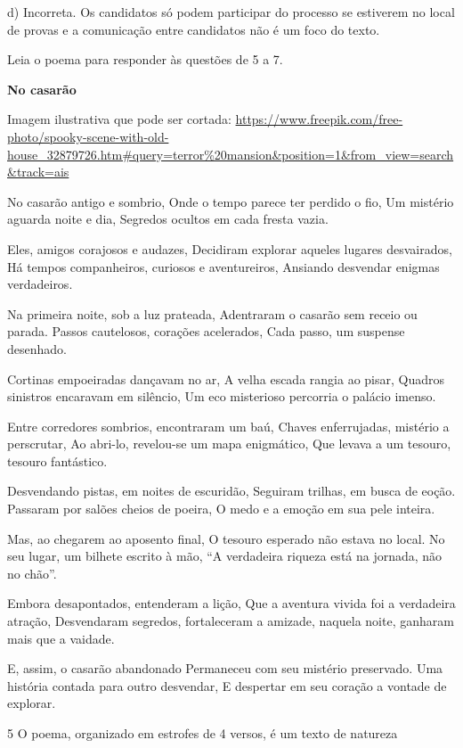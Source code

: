 \begin{escolha}
\begin{escolha}
\begin{escolha}
\begin{escolha}
\begin{escolha}
d) Incorreta. Os candidatos só podem participar do processo se estiverem
no local de provas e a comunicação entre candidatos não é um foco do
texto.

Leia o poema para responder às questões de 5 a 7.

\textbf{No casarão}

Imagem ilustrativa que pode ser cortada:
\url{https://www.freepik.com/free-photo/spooky-scene-with-old-house_32879726.htm\#query=terror\%20mansion\&position=1\&from_view=search\&track=ais}

No casarão antigo e sombrio, Onde o tempo parece ter perdido o fio, Um
mistério aguarda noite e dia, Segredos ocultos em cada fresta vazia.

Eles, amigos corajosos e audazes, Decidiram explorar aqueles lugares
desvairados, Há tempos companheiros, curiosos e aventureiros, Ansiando
desvendar enigmas verdadeiros.

Na primeira noite, sob a luz prateada, Adentraram o casarão sem receio
ou parada. Passos cautelosos, corações acelerados, Cada passo, um
suspense desenhado.

Cortinas empoeiradas dançavam no ar, A velha escada rangia ao pisar,
Quadros sinistros encaravam em silêncio, Um eco misterioso percorria o
palácio imenso.

Entre corredores sombrios, encontraram um baú, Chaves enferrujadas,
mistério a perscrutar, Ao abri-lo, revelou-se um mapa enigmático, Que
levava a um tesouro, tesouro fantástico.

Desvendando pistas, em noites de escuridão, Seguiram trilhas, em busca
de eoção. Passaram por salões cheios de poeira, O medo e a emoção em sua
pele inteira.

Mas, ao chegarem ao aposento final, O tesouro esperado não estava no
local. No seu lugar, um bilhete escrito à mão, ``A verdadeira riqueza
está na jornada, não no chão''.

Embora desapontados, entenderam a lição, Que a aventura vivida foi a
verdadeira atração, Desvendaram segredos, fortaleceram a amizade,
naquela noite, ganharam mais que a vaidade.

E, assim, o casarão abandonado Permaneceu com seu mistério preservado.
Uma história contada para outro desvendar, E despertar em seu coração a
vontade de explorar.


\num{5} O poema, organizado em estrofes de 4 versos, é um texto de
natureza

\end{escolha}
\end{escolha}
\end{escolha}
\end{escolha}
\end{escolha}
